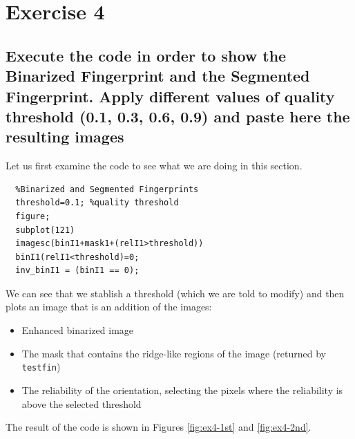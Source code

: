 \documentclass[a4paper]{article}
\def\inline{\lstinline[basicstyle=\ttfamily,keywordstyle={}]}
\begin{document}
\section{Exercise 4}

\subsection{ Execute the code in order to show the Binarized Fingerprint and the Segmented Fingerprint. Apply different values of quality threshold (0.1, 0.3, 0.6, 0.9) and paste here the resulting images}

Let us first examine the code to see what we are doing in this section.

\begin{verbatim}
  %Binarized and Segmented Fingerprints
  threshold=0.1; %quality threshold
  figure;
  subplot(121)
  imagesc(binI1+mask1+(relI1>threshold)) 
  binI1(relI1<threshold)=0; 
  inv_binI1 = (binI1 == 0); 
\end{verbatim}

We can see that we stablish a threshold (which we are told to modify) and then plots an image that is an addition of the images:
\begin{itemize}
\item Enhanced binarized image
\item The mask that contains the ridge-like regions of the image (returned by \inline{testfin})
\item The reliability of the orientation, selecting the pixels where the reliability is above the selected threshold
\end{itemize}

The result of the code is shown in Figures \ref{fig:ex4-1st} and \ref{fig:ex4-2nd}.
\end{document}

